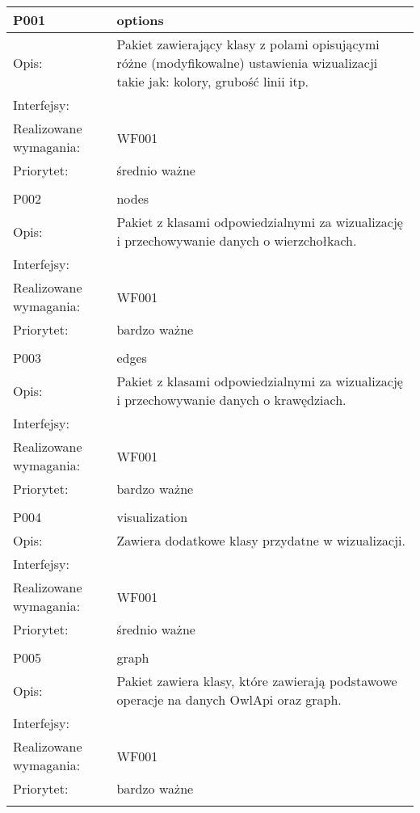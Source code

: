 \documentclass[a4paper,10pt]{article}
\begin{document}
\begin{center}
\begin{longtable}{|m{3cm}|m{9cm}|} \hline

P001 & options\\ \hline
Opis: & Pakiet zawierający klasy z polami opisującymi różne (modyfikowalne) ustawienia wizualizacji takie jak: kolory, grubość linii itp.     \\ \hline
Interfejsy: &     \\ \hline
Realizowane wymagania: & WF001 \\ \hline
Priorytet: & średnio ważne \\ \hline

\multicolumn{2}{c}{} \\
 \hline

P002 & nodes\\ \hline
Opis: & Pakiet z klasami odpowiedzialnymi za wizualizację i przechowywanie danych o wierzchołkach.    \\ \hline
Interfejsy: &     \\ \hline
Realizowane wymagania: & WF001 \\ \hline
Priorytet: & bardzo ważne \\ \hline

\multicolumn{2}{c}{} \\
 \hline

P003 & edges\\ \hline
Opis: & Pakiet z klasami odpowiedzialnymi za wizualizację i przechowywanie danych o krawędziach.    \\ \hline
Interfejsy: &     \\ \hline
Realizowane wymagania: & WF001 \\ \hline
Priorytet: & bardzo ważne \\ \hline

\multicolumn{2}{c}{} \\
 \hline

P004 & visualization\\ \hline
Opis: & Zawiera dodatkowe klasy przydatne w wizualizacji.\\ \hline
Interfejsy: &     \\ \hline
Realizowane wymagania: & WF001 \\ \hline
Priorytet: & średnio ważne \\ \hline

\multicolumn{2}{c}{} \\
 \hline

P005 & graph\\ \hline
Opis: & Pakiet zawiera klasy, które zawierają podstawowe operacje na danych OwlApi oraz graph. \\ \hline
Interfejsy: &     \\ \hline
Realizowane wymagania: & WF001 \\ \hline
Priorytet: & bardzo ważne \\ \hline

\multicolumn{2}{c}{} \\
 \hline

\end{longtable}

\end{center}
\end{document}
